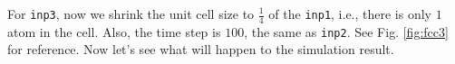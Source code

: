 
For \texttt{inp3}, now we shrink the unit cell size to $\frac{ 1 }{ 4 }$ of the
\texttt{inp1}, i.e., there is only $1$  atom in the cell. 
Also, the time step is $100$, the same as \texttt{inp2}.
See Fig. \ref{fig:fcc3} for reference.
Now let's see what will happen to the simulation result. 

